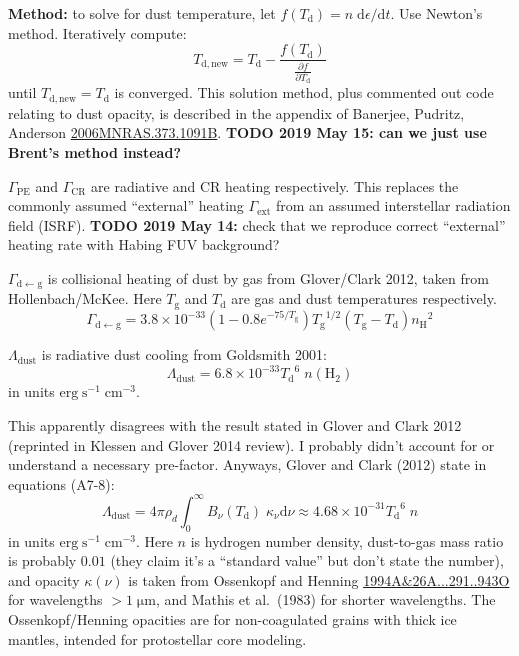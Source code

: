 \documentclass[10pt]{article}
\newcommand*{\mt}{\mathrm}
\newcommand*{\unit}[1]{\;\mt{#1}}  %
\newcommand*{\ptl}{\partial}
\newcommand*{\dtl}{\mathrm{d}}
\begin{document}
\textbf{Method:} to solve for dust temperature, let $f\left(T_\mt{d}\right) = n \; \dtl\epsilon/\dtl t$.
Use Newton's method.  Iteratively compute:
\[
    T_\mt{d,new} = T_\mt{d} - \frac{ f\left(T_\mt{d}\right) }{ \frac{\ptl f}{\ptl T_\mt{d}} }
\]
until $T_\mt{d,new} = T_\mt{d}$ is converged.  This solution method, plus
commented out code relating to dust opacity, is described in the appendix of
Banerjee, Pudritz, Anderson \href{http://adsabs.harvard.edu/abs/2006MNRAS.373.1091B}{2006MNRAS.373.1091B}.
\textbf{TODO 2019 May 15: can we just use Brent's method instead?}

$\Gamma_\mt{PE}$ and $\Gamma_\mt{CR}$ are radiative and CR heating
respectively.  This replaces the commonly assumed ``external'' heating
$\Gamma_\mt{ext}$ from an assumed interstellar radiation field (ISRF).
\textbf{TODO 2019 May 14:} check that we reproduce correct ``external'' heating
rate with Habing FUV background?

$\Gamma_\mt{d\leftarrow g}$ is collisional heating of dust by gas from
Glover/Clark 2012, taken from Hollenbach/McKee.  Here $T_\mt{g}$ and $T_\mt{d}$
are gas and dust temperatures respectively.
\[
    \Gamma_\mt{d\leftarrow g}
    = 3.8 \times 10^{-33} \left(1 - 0.8 e^{-75/T_\mt{g}}\right)
    {T_\mt{g}}^{1/2} \left( T_\mt{g} - T_\mt{d} \right) {n_\mt{H}}^2
\]


$\Lambda_\mt{dust}$ is radiative dust cooling from Goldsmith 2001:
\[
    \Lambda_\mt{dust}
    =
    6.8 \times 10^{-33} {T_\mt{d}}^6 \; n\left(\mt{H}_2\right)
\]
in units $\mathrm{erg \; s^{-1} \; cm^{-3}}$.

This apparently disagrees with the result stated in Glover and Clark 2012
(reprinted in Klessen and Glover 2014 review).
I probably didn't account for or understand a necessary pre-factor.
Anyways, Glover and Clark (2012) state in equations (A7-8):
\[
    \Lambda_\mt{dust}
    =
    4\pi \rho_d \int_0^\infty B_\nu\left(T_\mt{d}\right) \; \kappa_\nu \dtl\nu
    \approx
    4.68 \times 10^{-31} {T_\mt{d}}^6 \; n
\]
in units $\mathrm{erg \; s^{-1} \; cm^{-3}}$.
Here $n$ is hydrogen number density, dust-to-gas mass ratio is probably $0.01$
(they claim it's a ``standard value'' but don't state the number),
and opacity $\kappa(\nu)$ is taken from Ossenkopf and Henning
\href{http://adsabs.harvard.edu/abs/1994A\%26A...291..943O}{1994A\&26A...291..943O}
for wavelengths $> 1 \unit{\mu m}$, and Mathis et al.~(1983) for shorter
wavelengths.  The Ossenkopf/Henning opacities are for non-coagulated grains
with thick ice mantles, intended for protostellar core modeling.
\end{document}
